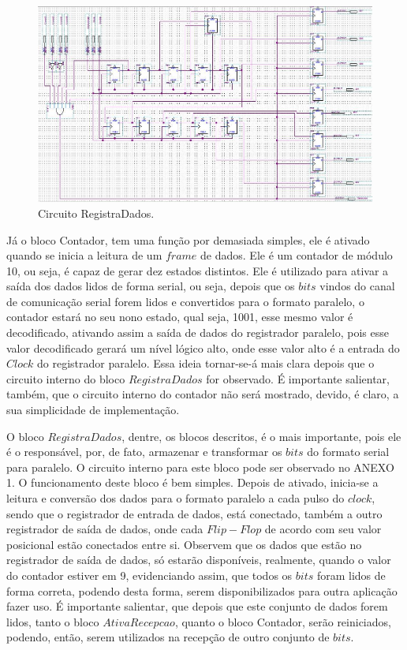 \documentclass[12pt]{article}
\begin{document}
\begin{figure}[h]
\centering
\includegraphics[width=1\textwidth]{img/aa1.jpg}
\caption{Circuito RegistraDados.}
\label{fig:fsm}
\end{figure}


Já o bloco Contador, tem uma função por demasiada simples, ele é ativado quando se inicia a leitura de um $frame$ de dados. Ele é um contador de módulo 10, ou seja, é capaz de gerar dez estados distintos. Ele é utilizado para ativar a saída dos dados lidos de forma serial, ou seja, depois que os $bits$ vindos do canal de comunicação serial forem lidos e convertidos para o formato paralelo, o contador estará no seu nono estado, qual seja, 1001, esse mesmo valor é decodificado, ativando assim a saída de dados do registrador paralelo, pois esse valor decodificado gerará um nível lógico alto, onde esse valor alto é a entrada do $Clock$ do registrador paralelo. Essa ideia tornar-se-á mais clara depois que o circuito interno do bloco $RegistraDados$ for observado. É importante salientar, também, que o circuito interno do contador não será mostrado, devido, é claro, a sua simplicidade de implementação.

O bloco $RegistraDados$, dentre, os blocos descritos, é o mais importante, pois ele é o responsável, por, de fato, armazenar e transformar os $bits$ do formato serial para paralelo. O circuito interno para este bloco pode ser observado no ANEXO 1.  O funcionamento deste bloco é bem simples. Depois de ativado, inicia-se a leitura e conversão dos dados para o formato paralelo a cada pulso do $clock$, sendo que o registrador de entrada de dados, está conectado, também a outro registrador de saída de dados, onde cada $Flip-Flop$ de acordo com seu valor posicional estão conectados entre si. Observem que os dados que estão no registrador de saída de dados, só estarão disponíveis, realmente, quando o valor do contador estiver em 9, evidenciando assim, que todos os $bits$ foram lidos de forma correta, podendo desta forma, serem disponibilizados para outra aplicação fazer uso.  É importante salientar, que depois que este conjunto de dados forem lidos, tanto o bloco $AtivaRecepcao$, quanto o bloco Contador, serão reiniciados, podendo, então, serem utilizados na recepção de outro conjunto de $bits$.
\end{document}
